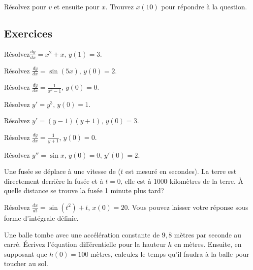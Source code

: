 \begin{exercise}
Résolvez pour $v$ et ensuite pour $x$.  Trouvez $x(10)$ pour répondre à la question.
\end{exercise}

\subsection{Exercices}

\begin{exercise}
Résolvez$\frac{dy}{dx} = x^2+x$, $y(1)=3$.
\end{exercise}

\begin{exercise}
Résolvez $\frac{dy}{dx} = \sin (5x)$, $y(0)=2$.
\end{exercise}

\begin{exercise}
Résolvez $\frac{dy}{dx} = \frac{1}{x^2-1}$, $y(0)=0$.
\end{exercise}

\begin{exercise}
Résolvez $y' = y^3$, $y(0)=1$.
\end{exercise}

\begin{exercise}
Résolvez $y' = (y-1)(y+1)$, $y(0)=3$.
\end{exercise}

\begin{exercise}
Résolvez $\frac{dy}{dx} = \frac{1}{y+1}$, $y(0)=0$.
\end{exercise}

\begin{exercise}
Résolvez $y'' = \sin x$, $y(0)=0$, $y'(0) = 2$.
\end{exercise}

\begin{exercise}
Une fusée se déplace à une vitesse de  ($t$ est mesuré en secondes).  La terre est directement derrière la fusée et à $t=0$, elle est à 1000 kilomètres de la terre.  À quelle distance se trouve la fusée 1 minute plus tard?
\end{exercise}

\begin{exercise}
Résolvez $\frac{dx}{dt} = \sin(t^2)+t$, $x(0)=20$.  Vous pouvez laisser votre réponse sous forme d'intégrale définie.
\end{exercise}

\begin{exercise}
Une balle tombe avec une accélération constante de $9,8$ mètres par seconde au carré.  Écrivez l'équation différentielle pour la hauteur $h$ en mètres.  Ensuite, en supposant que $h(0) = 100$ mètres, calculez le temps qu'il faudra à la balle pour toucher au sol.

\end{exercise}

